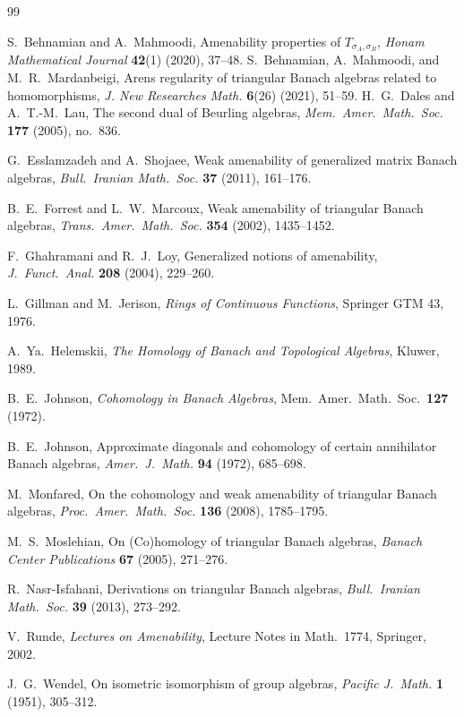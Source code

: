 \documentclass{article}
\theoremstyle{plain}
\theoremstyle{definition}
\begin{document}
\begin{thebibliography}{99}

S.~Behnamian and A.~Mahmoodi,
Amenability properties of $T_{\sigma_A,\sigma_B}$,
\emph{Honam Mathematical Journal} \textbf{42}(1) (2020), 37--48.
S.~Behnamian, A.~Mahmoodi, and M.~R.~Mardanbeigi,
Arens regularity of triangular Banach algebras related to homomorphisms,
\emph{J. New Researches Math.} \textbf{6}(26) (2021), 51--59.
H.~G.~Dales and A.~T.-M.~Lau,
The second dual of Beurling algebras,
\emph{Mem.\ Amer.\ Math.\ Soc.} \textbf{177} (2005), no.~836.

G.~Esslamzadeh and A.~Shojaee,
Weak amenability of generalized matrix Banach algebras,
\emph{Bull.\ Iranian Math.\ Soc.} \textbf{37} (2011), 161--176.

B.~E.~Forrest and L.~W.~Marcoux,
Weak amenability of triangular Banach algebras,
\emph{Trans.\ Amer.\ Math.\ Soc.} \textbf{354} (2002), 1435--1452.

F.~Ghahramani and R.~J.~Loy,
Generalized notions of amenability,
\emph{J.\ Funct.\ Anal.} \textbf{208} (2004), 229--260.

L.~Gillman and M.~Jerison,
\emph{Rings of Continuous Functions},
Springer GTM 43, 1976.

A.~Ya.~Helemskii,
\emph{The Homology of Banach and Topological Algebras},
Kluwer, 1989.

B.~E.~Johnson,
\emph{Cohomology in Banach Algebras},
Mem.\ Amer.\ Math.\ Soc.\ \textbf{127} (1972).

B.~E.~Johnson,
Approximate diagonals and cohomology of certain annihilator Banach algebras,
\emph{Amer.\ J.\ Math.} \textbf{94} (1972), 685--698.

M.~Monfared,
On the cohomology and weak amenability of triangular Banach algebras,
\emph{Proc.\ Amer.\ Math.\ Soc.} \textbf{136} (2008), 1785--1795.

M.~S.~Moslehian,
On (Co)homology of triangular Banach algebras,
\emph{Banach Center Publications} \textbf{67} (2005), 271--276.

R.~Nasr-Isfahani,
Derivations on triangular Banach algebras,
\emph{Bull.\ Iranian Math.\ Soc.} \textbf{39} (2013), 273--292.

V.~Runde,
\emph{Lectures on Amenability},
Lecture Notes in Math.\ 1774, Springer, 2002.

J.~G.~Wendel,
On isometric isomorphism of group algebras,
\emph{Pacific J.\ Math.} \textbf{1} (1951), 305--312.

\end{thebibliography}
\end{document}
